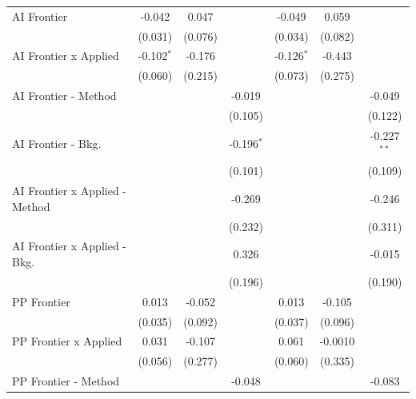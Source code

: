 \begin{tabular}{lcccccc}
   AI Frontier                    & -0.042       & 0.047        &               & -0.049       & 0.059   &   \\   
                                  & (0.031)      & (0.076)      &               & (0.034)      & (0.082) &   \\   
   AI Frontier x Applied          & -0.102$^{*}$ & -0.176       &               & -0.126$^{*}$ & -0.443  &   \\   
                                  & (0.060)      & (0.215)      &               & (0.073)      & (0.275) &   \\   
   AI Frontier - Method           &              &              & -0.019        &              &         & -0.049\\   
                                  &              &              & (0.105)       &              &         & (0.122)\\   
   AI Frontier - Bkg.             &              &              & -0.196$^{*}$  &              &         & -0.227$^{**}$\\   
                                  &              &              & (0.101)       &              &         & (0.109)\\   
   AI Frontier x Applied - Method &              &              & -0.269        &              &         & -0.246\\   
                                  &              &              & (0.232)       &              &         & (0.311)\\   
   AI Frontier x Applied - Bkg.   &              &              & 0.326         &              &         & -0.015\\   
                                  &              &              & (0.196)       &              &         & (0.190)\\   
   PP Frontier                    & 0.013        & -0.052       &               & 0.013        & -0.105  &   \\   
                                  & (0.035)      & (0.092)      &               & (0.037)      & (0.096) &   \\   
   PP Frontier x Applied          & 0.031        & -0.107       &               & 0.061        & -0.0010 &   \\   
                                  & (0.056)      & (0.277)      &               & (0.060)      & (0.335) &   \\   
   PP Frontier - Method           &              &              & -0.048        &              &         & -0.083\\   

\end{tabular}

